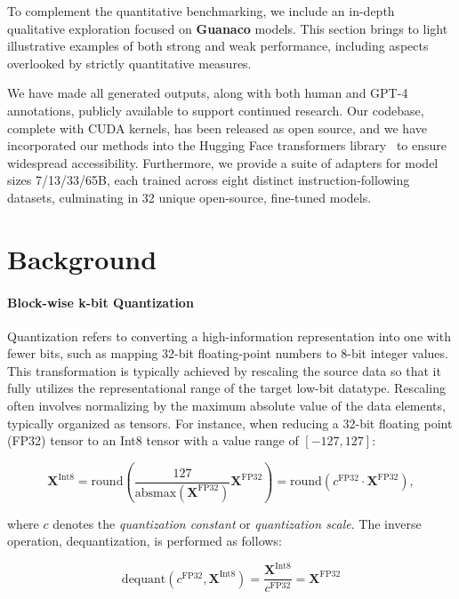 To complement the quantitative benchmarking, we include an in-depth qualitative exploration focused on \textbf{Guanaco} models. This section brings to light illustrative examples of both strong and weak performance, including aspects overlooked by strictly quantitative measures.

We have made all generated outputs, along with both human and GPT-4 annotations, publicly available to support continued research. Our codebase, complete with CUDA kernels, has been released as open source, and we have incorporated our methods into the Hugging Face transformers library~\citep{wolf2019huggingface} to ensure widespread accessibility. Furthermore, we provide a suite of adapters for model sizes 7/13/33/65B, each trained across eight distinct instruction-following datasets, culminating in 32 unique open-source, fine-tuned models.

\section{Background}
\paragraph{Block-wise k-bit Quantization} Quantization refers to converting a high-information representation into one with fewer bits, such as mapping 32-bit floating-point numbers to 8-bit integer values. This transformation is typically achieved by rescaling the source data so that it fully utilizes the representational range of the target low-bit datatype. Rescaling often involves normalizing by the maximum absolute value of the data elements, typically organized as tensors. For instance, when reducing a 32-bit floating point (FP32) tensor to an Int8 tensor with a value range of $[-127, 127]$:

\begin{equation}
    \mathbf{X}^{ \text{Int8}} = \text{round}\left( \frac{127}{{\text{absmax}}(\mathbf{X}^{{\text{FP32}}})}\mathbf{X}^{{\text{FP32}}} \right) = \text{round}(c^{\text{FP32}}\cdot \mathbf{X}^{{\text{FP32}}}),
\end{equation}

where $c$ denotes the {\em quantization constant} or {\em quantization scale}. The inverse operation, dequantization, is performed as follows:

\begin{equation}
    \text{dequant}(c^{\text{FP32}}, \mathbf{X}^{\text{Int8}}) = \frac{\mathbf{X}^{\text{Int8}}}{c^{\text{FP32}}} = \mathbf{X}^{\text{FP32}}
\end{equation}

